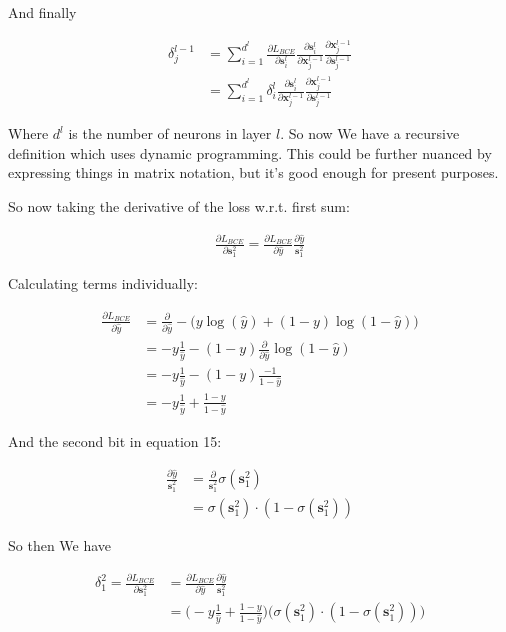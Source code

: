 \documentclass{article}
\begin{document}
	And finally 
	
	\begin{align}
		\delta^{l-1}_j &= \sum^{d^l}_{i=1}\frac{\partial L_{BCE}}{\partial \mathbf{s}^l_i} \frac{\partial \mathbf{s}^l_i}{\partial \mathbf{x}^{l-1}_j}\frac{\partial \mathbf{x}^{l-1}_j}{\partial \mathbf{s}^{l-1}_j}\\
		&= \sum^{d^l}_{i=1}  \delta^l_i \frac{\partial \mathbf{s}^l_i}{\partial \mathbf{x}^{l-1}_j}\frac{\partial \mathbf{x}^{l-1}_j}{\partial \mathbf{s}^{l-1}_j}
	\end{align}
	
	Where $d^l$ is the number of neurons in layer $l$. So now We have a recursive definition which uses dynamic programming. This could be further nuanced by expressing things in matrix notation, but it's good enough for present purposes.
	
	
	 
	 So now taking the derivative of the loss w.r.t. first sum:
	 
	 \begin{align}
	 	\frac{\partial L_{BCE}}{\partial \mathbf{s}^2_1} = \frac{\partial L_{BCE}}{\partial \hat{y}} \frac{\partial \hat{y}}{\mathbf{s}^2_1} 
	 \end{align}
	 
	 Calculating terms individually:
	 
	 \begin{align}
	 	\frac{\partial L_{BCE}}{\partial \hat{y}} &= \frac{\partial }{\partial \hat{y}}-\big(y\log(\hat{y}) + (1-y)\log(1-\hat{y}) \big)\\
	 	&=-y\frac{1}{\hat{y}}  - (1-y)\frac{\partial }{\partial \hat{y}} \log(1-\hat{y}) \\
	 	&=-y\frac{1}{\hat{y}}  - (1-y)\frac{-1}{1-\hat{y}}\\
	 	&=-y\frac{1}{\hat{y}}  + \frac{1-y}{1-\hat{y}}
	 \end{align}
	 
	And the second bit in equation 15:
	 
	 \begin{align}
	 	\frac{\partial \hat{y}}{\mathbf{s}^2_1}  &= \frac{\partial }{\mathbf{s}^2_1} \sigma(\mathbf{s}^2_1)\\
	 	&= \sigma(\mathbf{s}^2_1)\cdot(1-\sigma(\mathbf{s}^2_1))
	 \end{align}
	 
	 So then We have 
	
	\begin{align}
	 	\delta^2_1 = \frac{\partial L_{BCE}}{\partial \mathbf{s}^2_1} &= \frac{\partial L_{BCE}}{\partial \hat{y}} \frac{\partial \hat{y}}{\mathbf{s}^2_1} \\
	 	&= \bigg( -y\frac{1}{\hat{y}}  + \frac{1-y}{1-\hat{y}} \bigg) \bigg( \sigma(\mathbf{s}^2_1)\cdot(1-\sigma(\mathbf{s}^2_1)) \bigg)
	 \end{align}
	 
\end{document}
